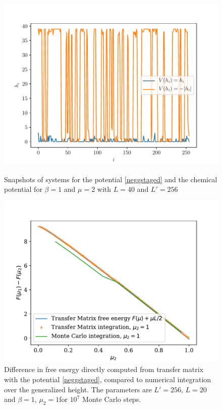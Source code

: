 {\begin{figure}
    \centering
	\includegraphics[width=0.7\linewidth]{int-dyn/comp-potentiels-chimiques.pdf}
	\caption{Snapshots of systems for the potential \eqref{neggstaged} and the chemical potential for $\beta=1$ and $\mu=2$ with $L=40$ and $L'=256$}
    \label{fig-negstagged}	
    \centering
   	\includegraphics[width=0.7\linewidth]{int-dyn/integration-free-ene-negstagged.pdf}
    \caption{Difference in free energy directly computed from transfer matrix with the potential \eqref{neggstaged}, compared to numerical integration over the generalized height. The parameters are $L' = 256$, $L=20$ and $\beta=1$, $\mu_2 = 1$for $10^7$ Monte Carlo steps. } 
   	\label{fig-int-negstagged}    
\end{figure}  

}
